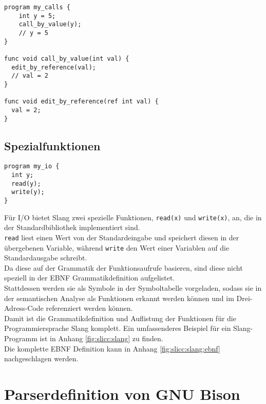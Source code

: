\begin{lstlisting}[caption={Call-by-Value und Call-by-Reference}]
program my_calls {
    int y = 5;
    call_by_value(y);
    // y = 5
}

func void call_by_value(int val) {
  edit_by_reference(val);
  // val = 2
}

func void edit_by_reference(ref int val) {
  val = 2;
}
\end{lstlisting}

\pagebreak

\subsection{Spezialfunktionen}

\begin{lstlisting}[caption={Slang Beispiel I/O Funktionen}]
program my_io {
  int y;
  read(y);
  write(y);
}
\end{lstlisting}

Für I/O bietet Slang zwei spezielle Funktionen, \texttt{read(x)} und \texttt{write(x)}, an, die in der Standardbibliothek implementiert sind.\\
\texttt{read} liest einen Wert von der Standardeingabe und speichert diesen in der übergebenen Variable, während \texttt{write} den Wert einer Variablen auf die Standardausgabe schreibt.\\

Da diese auf der Grammatik der Funktionsaufrufe basieren, sind diese nicht speziell in der EBNF Grammatikdefinition aufgelistet.\\
Stattdessen werden sie als Symbole in der Symboltabelle vorgeladen, sodass sie in der semantischen Analyse als Funktionen erkannt werden können und im Drei-Adress-Code referenziert werden können.\\

Damit ist die Grammatikdefinition und Auflistung der Funktionen für die Programmiersprache Slang komplett.
Ein umfassenderes Beispiel für ein Slang-Programm ist in Anhang \ref{fig:slicc:slang} zu finden. \\
Die komplette EBNF Definition kann in Anhang \ref{fig:slicc:slang:ebnf} nachgeschlagen werden. 

\pagebreak

\section{Parserdefinition von GNU Bison}

